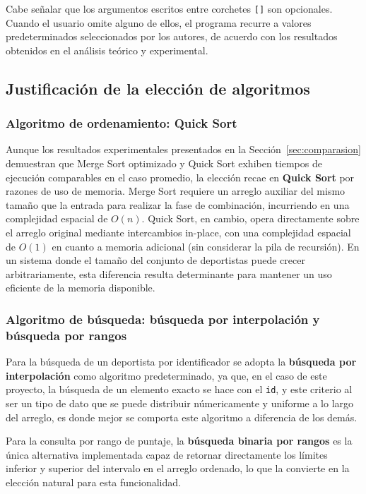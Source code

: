 Cabe señalar que los argumentos escritos entre corchetes \texttt{[]} son opcionales. Cuando el usuario omite alguno de ellos, el programa recurre a valores predeterminados seleccionados por los autores, de acuerdo con los resultados obtenidos en el análisis teórico y experimental.

\newpage
\subsection{Justificación de la elección de algoritmos}\label{sec:justificacion}

\subsubsection{Algoritmo de ordenamiento: Quick Sort}
Aunque los resultados experimentales presentados en la Sección~\ref{sec:comparasion} demuestran que Merge Sort optimizado y Quick Sort exhiben tiempos de ejecución comparables en el caso promedio, la elección recae en \textbf{Quick Sort} por razones de uso de memoria. Merge Sort requiere un arreglo auxiliar del mismo tamaño que la entrada para realizar la fase de combinación, incurriendo en una complejidad espacial de $O(n)$. Quick Sort, en cambio, opera directamente sobre el arreglo original mediante intercambios in-place, con una complejidad espacial de $O(1)$ en cuanto a memoria adicional (sin considerar la pila de recursión). En un sistema donde el tamaño del conjunto de deportistas puede crecer arbitrariamente, esta diferencia resulta determinante para mantener un uso eficiente de la memoria disponible.

\subsubsection{Algoritmo de búsqueda: búsqueda por interpolación y búsqueda por rangos}
Para la búsqueda de un deportista por identificador se adopta la \textbf{búsqueda por interpolación} como algoritmo predeterminado, ya que, en el caso de este proyecto, la búsqueda de un elemento exacto se hace con el \texttt{id}, y este criterio al ser un tipo de dato que se puede distribuir númericamente y uniforme a lo largo del arreglo, es donde mejor se comporta este algoritmo a diferencia de los demás.

Para la consulta por rango de puntaje, la \textbf{búsqueda binaria por rangos} es la única alternativa implementada capaz de retornar directamente los límites inferior y superior del intervalo en el arreglo ordenado, lo que la convierte en la elección natural para esta funcionalidad.